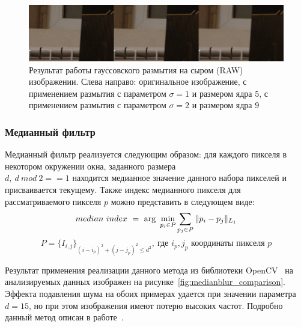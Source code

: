 \documentclass[14pt]{mmcs_article}
\begin{document}
\begin{figure}[H]
	\centering
	\includegraphics[width=\textwidth]{img/real_noise_gaussian_params_comparison}
	\caption{Результат работы гауссовского размытия на сыром (RAW) изображении. Слева направо: оригинальное изображение, с применением размытия с параметром $\sigma = 1$ и размером ядра $5$, с применением размытия с параметром $\sigma = 2$ и размером ядра $9$}
	\label{fig:real_noise_gauss_comparison}
\end{figure}

\subsubsection{Медианный фильтр}

Медианный фильтр реализуется следующим образом: для каждого пикселя в некотором окружении окна, заданного размера\\ $d,\ d\ mod\ 2 == 1$ находится медианное значение данного набора пикселей и присваивается текущему. Также индекс медианного пикселя для рассматриваемого пикселя $p$ можно представить в следующем виде:
\begin{equation}
median\ index\ =\ \arg\ \min_{p_i \in P} \sum_{p_j \in P} \Arrowvert p_i - p_j \Arrowvert_{L_1}
\end{equation}
$$P = \{I_{i, j}\}_ {(i - i_p)^2 + (j - j_p)^2 \le d^2},\ \text{где }i_p, j_p\text{ координаты пикселя }p$$

Результат применения реализации данного метода из библиотеки OpenCV~\autocite{OpenCVLib} на анализируемых данных изображен на рисунке~\ref{fig:medianblur_comparison}. Эффекта подавления шума на обоих примерах удается при значении параметра $d = 15$, но при этом изображения имеют потерю высоких частот. Подробно данный метод описан в работе~\autocite{MedianBluPaper}. 
\end{document}
